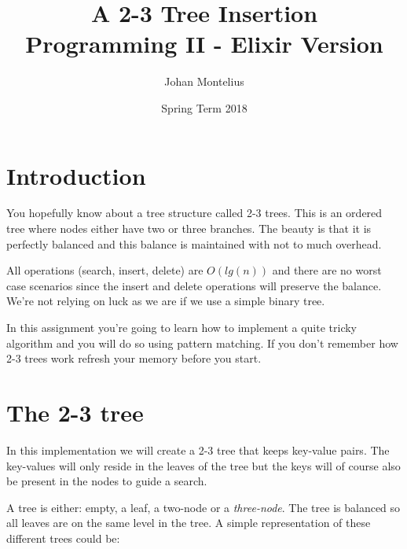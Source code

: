 \documentclass[a4paper,11pt]{article}
\begin{document}

\title{
    \textbf{A 2-3 Tree Insertion}\\
    \large{Programming II - Elixir Version}
}
\author{Johan Montelius}
\date{Spring Term 2018}
\maketitle
{}



\section*{Introduction}

You hopefully know about a tree structure called 2-3 trees. This is an
ordered tree where nodes either have two or three branches. The beauty
is that it is perfectly balanced and this balance is maintained with
not to much overhead. 

All operations (search, insert, delete) are $O(lg(n))$ and there are
no worst case scenarios since the insert and delete operations will
preserve the balance. We're not relying on luck as we are if we use a
simple binary tree.

In this assignment you're going to learn how to implement a quite
tricky algorithm and you will do so using pattern matching. If you don't
remember how 2-3 trees work refresh your memory before you start.



\section{The 2-3 tree}

In this implementation we will create a 2-3 tree that keeps key-value
pairs. The key-values will only reside in the leaves of the tree but the
keys will of course also be present in the nodes to guide a search.

A tree is either: empty, a leaf, a two-node or a {\em three-node}. The
tree is balanced so all leaves are on the same level in the tree. A
simple representation of these different trees could be:
\end{document}
